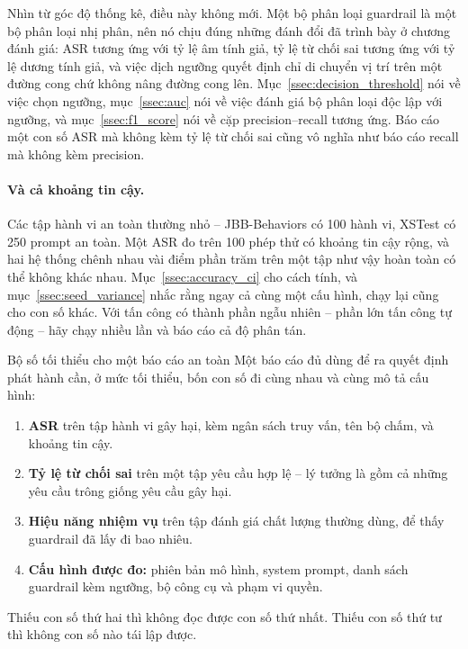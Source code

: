 Nhìn từ góc độ thống kê, điều này không mới. Một bộ phân loại guardrail là một bộ phân loại nhị phân, nên nó chịu đúng những đánh đổi đã trình bày ở chương đánh giá: ASR tương ứng với tỷ lệ âm tính giả, tỷ lệ từ chối sai tương ứng với tỷ lệ dương tính giả, và việc dịch ngưỡng quyết định chỉ di chuyển vị trí trên một đường cong chứ không nâng đường cong lên. Mục~\ref{ssec:decision_threshold} nói về việc chọn ngưỡng, mục~\ref{ssec:auc} nói về việc đánh giá bộ phân loại độc lập với ngưỡng, và mục~\ref{ssec:f1_score} nói về cặp precision--recall tương ứng. Báo cáo một con số ASR mà không kèm tỷ lệ từ chối sai cũng vô nghĩa như báo cáo recall mà không kèm precision.

\paragraph{Và cả khoảng tin cậy.} Các tập hành vi an toàn thường nhỏ -- JBB-Behaviors có 100 hành vi, XSTest có 250 prompt an toàn. Một ASR đo trên 100 phép thử có khoảng tin cậy rộng, và hai hệ thống chênh nhau vài điểm phần trăm trên một tập như vậy hoàn toàn có thể không khác nhau. Mục~\ref{ssec:accuracy_ci} cho cách tính, và mục~\ref{ssec:seed_variance} nhắc rằng ngay cả cùng một cấu hình, chạy lại cũng cho con số khác. Với tấn công có thành phần ngẫu nhiên -- phần lớn tấn công tự động -- hãy chạy nhiều lần và báo cáo cả độ phân tán.

\begin{assess}{Bộ số tối thiểu cho một báo cáo an toàn}
Một báo cáo đủ dùng để ra quyết định phát hành cần, ở mức tối thiểu, bốn con số đi cùng nhau và cùng mô tả cấu hình:

\begin{enumerate}
	\item \textbf{ASR} trên tập hành vi gây hại, kèm ngân sách truy vấn, tên bộ chấm, và khoảng tin cậy.
	\item \textbf{Tỷ lệ từ chối sai} trên một tập yêu cầu hợp lệ -- lý tưởng là gồm cả những yêu cầu trông giống yêu cầu gây hại.
	\item \textbf{Hiệu năng nhiệm vụ} trên tập đánh giá chất lượng thường dùng, để thấy guardrail đã lấy đi bao nhiêu.
	\item \textbf{Cấu hình được đo:} phiên bản mô hình, system prompt, danh sách guardrail kèm ngưỡng, bộ công cụ và phạm vi quyền.
\end{enumerate}

Thiếu con số thứ hai thì không đọc được con số thứ nhất. Thiếu con số thứ tư thì không con số nào tái lập được.
\end{assess}

